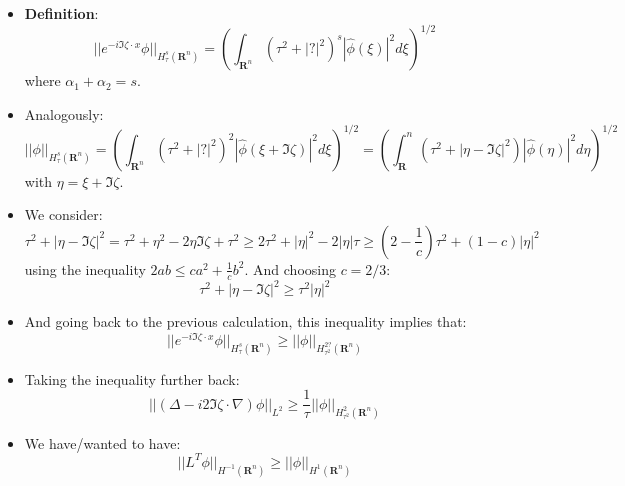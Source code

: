 \documentclass{article}
\begin{document}
\begin{itemize}
    \item \textbf{Definition}: 
    \begin{equation}
        ||e^{-i \Im  \zeta \cdot x} \phi ||_{H^s_\tau(\mathbf{R}^n)} = (\int_{\mathbf{R}^n} (\tau^2 + |?|^2)^s |\hat{\phi}(\xi)|^2 d\xi)^{1/2}
    \end{equation}
    where $\alpha_1 + \alpha_2  =s$.

    \item Analogously:
    \begin{equation}
        || \phi ||_{H^s_\tau(\mathbf{R}^n)} = (\int_{\mathbf{R}^n} (\tau^2 + |?|^2)^2 |\hat{\phi}(\xi + \Im \zeta)|^2 d\xi)^{1/2} = (\int_\mathbf{R}^n (\tau^2 + |\eta - \Im \zeta|^2) |\hat{\phi}(\eta)|^2 d\eta)^{1/2}
    \end{equation}
    with $\eta = \xi + \Im \zeta$.

    \item We consider:
    \begin{equation}
        \tau^2 + |\eta - \Im \zeta|^2 = \tau^2 + \eta^2 - 2 \eta \Im \zeta + \tau^2 \geq 2\tau^2 + |\eta|^2 - 2|\eta| \tau \geq (2 -\frac{1}{c}) \tau^2 + (1-c) |\eta|^2
    \end{equation}
    using the inequality $2ab \leq c a^2 + \frac{1}{c} b^2$. And choosing $c = 2/3$:
    \begin{equation}
        \tau^2 + |\eta - \Im \zeta|^2 \geq \tau^2 |\eta|^2
    \end{equation}

    \item And going back to the previous calculation, this inequality implies that:
    \begin{equation}
        ||e^{-i \Im  \zeta \cdot x} \phi ||_{H^s_\tau(\mathbf{R}^n)} \geq ||\phi||_{H_{\tau^2}^{2?} (\mathbf{R}^n)}
    \end{equation}

    \item Taking the inequality further back:
    \begin{equation}
        ||  (\Delta - i2 \Im \zeta \cdot \nabla) \phi ||_{L^2} \geq \frac{1}{\tau} ||\phi||_{H_{\tau^2}^{2} (\mathbf{R}^n)}
    \end{equation}

    \item We have/wanted to have:
    \begin{equation}
        || L^T\phi||_{H^{-1}(\mathbf{R}^n)} \geq ||\phi||_{H^1(\mathbf{R}^n)}
    \end{equation}


\end{itemize}
\end{document}
